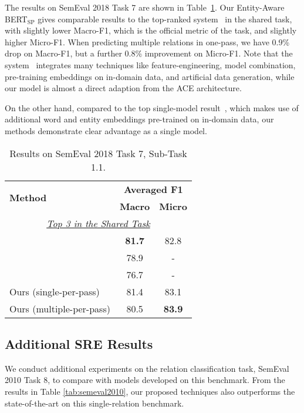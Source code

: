 \documentclass[11pt,a4paper]{article}
\begin{document}
The results on SemEval 2018 Task 7 are shown in Table~\ref{tab:semeval2018}.
Our Entity-Aware BERT$_{\textrm{SP}}$ gives comparable results to the top-ranked system~\cite{rotsztejn-etal-2018-eth} in the shared task, with slightly lower Macro-F1, which is the official metric of the task, and slightly higher Micro-F1.
When predicting multiple relations in one-pass, we have 0.9\% drop on Macro-F1, but a further 0.8\% improvement on Micro-F1.
Note that the system~\cite{rotsztejn-etal-2018-eth} integrates many techniques like feature-engineering, model combination, pre-training embeddings on in-domain data, and artificial data generation, while our model is almost a direct adaption from the ACE architecture.

On the other hand, compared to the top single-model result~\cite{luan-etal-2018-uwnlp}, which makes use of additional word and entity embeddings pre-trained on in-domain data, our methods demonstrate clear advantage as a single model. 

\begin{table}[!t]
\small
\centering
\begin{tabular}{lcc}
\toprule
\multirow{2}{*}{\textbf{Method}} &
\multicolumn{2}{c}{\textbf{Averaged F1}} \\ 
& \textbf{Macro}& \textbf{Micro} \\
\midrule
\multicolumn{3}{c}{\underline{\emph{Top 3 in the Shared Task}}}\\
\cite{rotsztejn-etal-2018-eth} & \bf 81.7 & 82.8\\
\cite{luan-etal-2018-uwnlp} & 78.9 & -\\
\cite{nooralahzadeh-etal-2018-sirius} & 76.7 & -\\
\midrule
Ours (single-per-pass) & 81.4 & 83.1 \\
Ours (multiple-per-pass) & 80.5 & \bf 83.9 \\
\bottomrule
\end{tabular}
\caption{\small Results on SemEval 2018 Task 7, Sub-Task 1.1.}
\label{tab:semeval2018}
\end{table}

\subsection{Additional SRE Results}
We conduct additional experiments on the relation classification task, SemEval 2010 Task 8, to compare with models developed on this benchmark.
From the results in Table \ref{tab:semeval2010}, our proposed techniques also outperforms the state-of-the-art on this single-relation benchmark.
\end{document}
